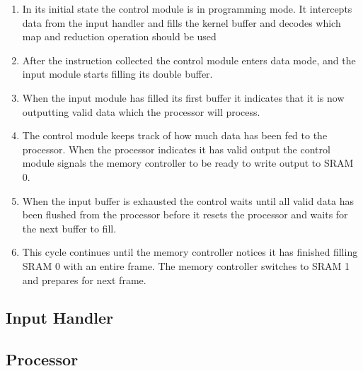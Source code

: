 \begin{enumerate}

    \item In its initial state the control module is in programming mode. It intercepts data from the input handler and fills the kernel buffer and decodes which map and reduction operation should be used
    \item After the instruction collected the control module enters data mode, and the input module starts filling its double buffer.
    \item When the input module has filled its first buffer it indicates that it is now outputting valid data which the processor will process.
    \item The control module keeps track of how much data has been fed to the processor. When the processor indicates it has valid output the control module signals the memory controller to be ready to write output to SRAM 0.
    \item When the input buffer is exhausted the control waits until all valid data has been flushed from the processor before it resets the processor and waits for the next buffer to fill.
    \item This cycle continues until the memory controller notices it has finished filling SRAM 0 with an entire frame. The memory controller switches to SRAM 1 and prepares for next frame.
\end{enumerate}

\subsection{Input Handler}


\subsection{Processor}

